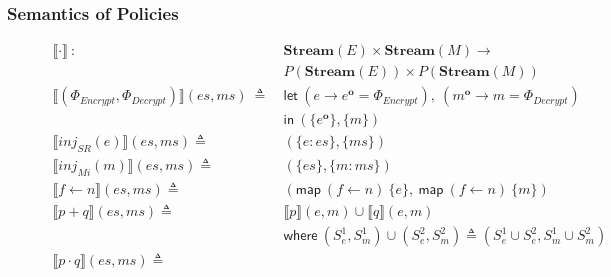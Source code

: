 \documentclass[sigconf,usenames,dvipsnames,svgnames,table]{acmart}
\newcommand{\interp}[1]{\llbracket #1 \rrbracket}
\newcommand{\obf}[1]{#1^\mathbf{o}}
\begin{document}
      \subsubsection{Semantics of Policies}\label{sec:spec:sem:pol}
        \begin{figure}
          \centering
          \begin{align*} 
            \interp { \cdot }\ 
              :\ \ &
              \mathbf{Stream}(E)\times \mathbf{Stream}(M) \rightarrow \\
              & P(\mathbf{Stream}(E))\times P(\mathbf{Stream}(M)) 
              \\
            \interp {(\Phi_{Encrypt}, \Phi_{Decrypt})}(es, ms)\
              \triangleq\
              & \mathsf{let}\ (e \rightarrow \obf{e} = \Phi_{Encrypt}),
                            \ (\obf{m} \rightarrow m = \Phi_{Decrypt})\\
              & \mathsf{in}\
              (\{\obf{e}\}, \{m\})
              \\
            \interp { inj_{SR}(e) }(es, ms)
              \triangleq\ &
              (\{e : es\}, \{ms\}) 
              \\
            \interp { inj_{Mi}(m) }(es, ms)
              \triangleq\ &
              (\{es\},\{m : ms\})
              \\
            \interp { f \leftarrow n }(es, ms)
              \triangleq\ &
              (\mathsf{map}\ (f\leftarrow n)\ \{e\},\
               \mathsf{map}\ (f\leftarrow n)\ \{m\})
              \\ %
            \interp { p + q }(es, ms)
              \triangleq\ &
              \interp { p }(e, m)\cup
              \interp { q }(e, m) \\
              &\mathsf{where}\ (S_e^1, S_m^1)\cup (S_e^2, S_m^2)\triangleq
                (S_e^1\cup S_e^2, S_m^1\cup S_m^2)\\
            \interp { p \cdot q }(es, ms)
              \triangleq\ &

\end{align*}
\end{figure}
\end{document}
